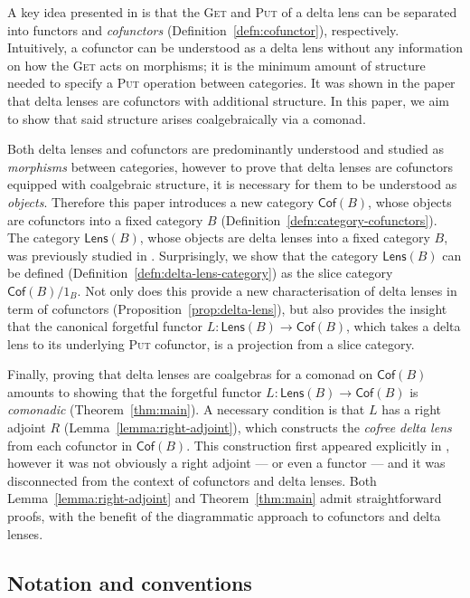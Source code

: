 \documentclass[colorlinks = true, a4paper, oneside, reqno, 11pt]{amsart}
\theoremstyle{definition}
\theoremstyle{remark}
\newcommand{\Cof}{\mathsf{Cof}}
\newcommand{\Lens}{\mathsf{Lens}}
\begin{document}
A key idea presented in \cite{AU17, Cla20} is that the 
\textsc{Get} and \textsc{Put} of a delta lens can be separated into 
functors and \emph{cofunctors} (Definition~\ref{defn:cofunctor}),
respectively. 
Intuitively, a cofunctor can be understood as a delta lens without 
any information on how the \textsc{Get} acts on morphisms; it is 
the minimum amount of structure needed to specify a \textsc{Put}
operation between categories. 
It was shown in the paper \cite{AU17} that delta lenses are cofunctors 
with additional structure. 
In this paper, we aim to show that said 
structure arises coalgebraically via a comonad. 

Both delta lenses and cofunctors are predominantly understood and 
studied as \emph{morphisms} between categories, however to prove that 
delta lenses are cofunctors equipped with coalgebraic structure, 
it is necessary for them to be understood as \emph{objects}. 
Therefore this paper introduces a new category $\Cof(B)$, whose 
objects are cofunctors into a fixed category $B$ 
(Definition~\ref{defn:category-cofunctors}). 
The category $\Lens(B)$, whose objects are delta lenses into a 
fixed category $B$, was previously studied in \cite{JR17, Cla20b}.
Surprisingly, we show that the category $\Lens(B)$ can be defined 
(Definition~\ref{defn:delta-lens-category}) as the slice category 
$\Cof(B) / 1_{B}$.  
Not only does this provide a new characterisation of delta lenses
in term of cofunctors (Proposition~\ref{prop:delta-lens}), 
but also provides the insight that the canonical forgetful functor 
$L \colon \Lens(B) \rightarrow \Cof(B)$, which takes a delta lens to its 
underlying \textsc{Put} cofunctor, is a projection from a 
slice category. 

Finally, proving that delta lenses are coalgebras for a comonad on 
$\Cof(B)$ amounts to showing that the forgetful functor 
$L \colon \Lens(B) \rightarrow \Cof(B)$ is \emph{comonadic}
(Theorem~\ref{thm:main}). 
A necessary condition is that $L$ has a right adjoint $R$ 
(Lemma~\ref{lemma:right-adjoint}), which 
constructs the \emph{cofree delta lens} from each cofunctor in $\Cof(B)$. 
This construction first appeared explicitly in 
\cite[Section~3.2]{AU16}, however it was not obviously a right adjoint
--- or even a functor --- and it was disconnected from 
the context of cofunctors and delta lenses. 
Both Lemma~\ref{lemma:right-adjoint} and 
Theorem~\ref{thm:main} admit straightforward proofs, with the 
benefit of the diagrammatic approach to cofunctors and delta lenses. 

\subsection*{Notation and conventions}
\end{document}
